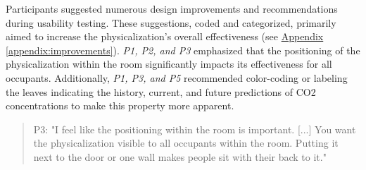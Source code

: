 Participants suggested numerous design improvements and recommendations during usability testing. These suggestions, coded and categorized, primarily aimed to increase the physicalization's overall effectiveness (see \hyperref[appendix:improvements]{Appendix \ref*{appendix:improvements}}). \textit{P1, P2, and P3 } emphasized that the positioning of the physicalization within the room significantly impacts its effectiveness for all occupants. Additionally, \textit{P1, P3, and P5} recommended color-coding or labeling the leaves indicating the history, current, and future predictions of CO2 concentrations to make this property more apparent.

\begin{quote}
P3: "I feel like the positioning within the room is important. [...] You want the physicalization visible to all occupants within the room. Putting it next to the door or one wall makes people sit with their back to it."
\end{quote}